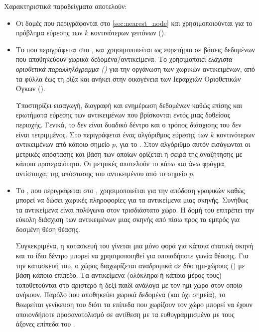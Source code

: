 Χαρακτηριστικά παραδείγματα αποτελούν:
\begin{itemize}
    \item Οι δομές  που 
    περιγράφονται στο \ref{sec:nearest_node} και χρησιμοποιούνται 
    για το πρόβλημα εύρεσης των $k$ κοντινότερων γειτόνων (). 

    \item Το  που περιγράφεται στο \cite{guttman1984r}, 
    και χρησιμοποιείται ως ευρετήριο σε βάσεις δεδομένων που αποθηκεύουν χωρικά 
    δεδομένα/αντικείμενα.
    Το  χρησιμοποιεί \textit{ελάχιστα οριοθετικά παραλληλόγραμμα ()}
    για την οργάνωση των χωρικών αντικειμένων, από τα φύλλα έως τη ρίζα και ανήκει 
    στην οικογένεια των Ιεραρχιών Οριοθετικών Όγκων ().

    Υποστηρίζει εισαγωγή, διαγραφή και ενημέρωση δεδομένων καθώς επίσης 
    και ερωτήματα εύρεσης των αντικειμένων που βρίσκονται εντός μιας δοθείσας περιοχής. 
    Γενικά, το  δεν είναι δυαδικό δέντρο και ο τρόπος διάσχισης του 
    δεν είναι τετριμμένος.
    Στο \cite{roussopoulos1995nearest} περιγράφεται ένας αλγόριθμος 
    εύρεσης των $k$ κοντινότερων αντικειμένων από κάποιο σημείο $p$, για το .
    Στον αλγόριθμο αυτόν εισάγωνται οι μετρικές απόστασης \textit{}
    και \textit{} βάση των οποίων ορίζεται η σειρά της αναζήτησης 
    με κάποια προτεραιότητα.
    Οι μετρικές αποτελούν το κάτω και άνω φράγμα, αντίστοιχα, της απόστασης του 
    αντικειμένου από το σημείο $p$.

    \item Το , που περιγράφεται στο \cite{fuchs1980visible},
    χρησιμοποιείται για την απόδοση γραφικών καθώς μπορεί να δώσει χωρικές πληροφορίες 
    για τα αντικείμενα μιας σκηνής. 
    Συνήθως τα αντικείμενα είναι πολύγωνα στον τρισδιάστατο χώρο.
    Η δομή του επιτρέπει την εύκολη διάσχιση των αντικειμένων μιας σκηνής από πίσω προς 
    τα εμπρός για δοσμένη θέση θέασης.

    Συγκεκριμένα, η κατασκευή του γίνεται μια μόνο φορά για κάποια στατική σκηνή 
    και το ίδιο δέντρο μπορεί να χρησιμοποιηθεί για οποιαδήποτε γωνία θέασης.
    Για την κατασκευή του, ο χώρος διαχωρίζεται αναδρομικά 
    σε δύο ημι-χώρους () με βάση κάποιο επίπεδο.
    Τα αντικείμενα (ολόκληρα ή κάποιο μέρος τους) τοποθετούνται στο αριστερό ή δεξί
    παιδί ανάλογα με τον ημι-χώρο στον οποίο ανήκουν.
    Παρόλο που αποθηκεύει χωρικά δεδομένα (και όχι σημεία), το  
    θεωρείται γενίκευση του  διότι τα επίπεδα που χωρίζουν 
    τον χώρο μπορεί να έχουν οποιονδήποτε προσανατολισμό σε αντίθεση 
    με τα ευθυγραμμισμένα με τους άξονες επίπεδα του .


\end{itemize}
